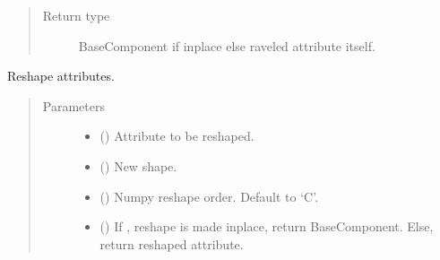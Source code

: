 \documentclass[letterpaper,10pt,english]{sphinxmanual}
\begin{document}
\begin{fulllineitems}
\begin{fulllineitems}
\begin{quote}
\begin{description}
\item[{Return type}] \leavevmode
BaseComponent if inplace else raveled attribute itself.

\end{description}\end{quote}

\end{fulllineitems}


\begin{fulllineitems}
\label{\detokenize{api/wells:geology.src.wells.WellSegment.reshape}}
Reshape  attributes.
\begin{quote}\begin{description}
\item[{Parameters}] \leavevmode\begin{itemize}
\item {} 
 (\sphinxstyleliteralemphasis{\sphinxupquote{, }}) \textendash{} Attribute to be reshaped.

\item {} 
 () \textendash{} New shape.

\item {} 
 () \textendash{} Numpy reshape order. Default to ‘C’.

\item {} 
 () \textendash{} If , reshape is made inplace, return BaseComponent.
Else, return reshaped attribute.

\end{itemize}


\end{description}
\end{quote}
\end{fulllineitems}
\end{fulllineitems}
\end{document}
